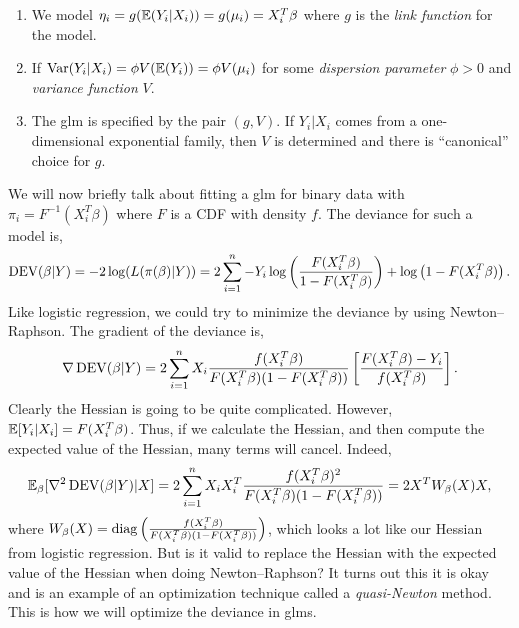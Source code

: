 \begin{enumerate}
    \item We  model $\eta_i = g({\mathbb{E}}(Y_i|X_i))=g(\mu_i)  =X_i^T\beta$ where $g$  is the \emph{link function} for the model.
    \item If  $\operatorname{Var}(Y_i|X_i)=\phi V({\mathbb{E}}(Y_i))=\phi V(\mu_i)$ for  some  \emph{dispersion parameter}  $\phi>0$ and \emph{variance function} $V$.
    \item The glm is specified by the pair  $(g,V)$. If   $Y_i|X_i$  comes  from  a  one-dimensional exponential family, then $V$  is  determined and there is ``canonical'' choice  for $g$.
\end{enumerate}

We will now briefly talk about fitting a glm for binary data with $\pi_i = F^{-1}(X_i^T\beta)$ where $F$ is a CDF with density  $f$. The deviance for such a  model is,
\[\operatorname{DEV}(\beta|Y)=-2\log(L(\pi(\beta)|Y)) = 2\sum_{i=1}^n-Y_i\log\left(\frac{F(X_i^T\beta)}{1-F(X_i^T\beta)}\right)+\log\left(1-F(X_i^T\beta)\right).  \]
Like logistic regression, we could try to minimize  the deviance by using Newton--Raphson. The gradient of the deviance is,
\[\nabla \operatorname{DEV}(\beta|Y) = 2\sum_{i=1}^n X_i  \frac{f(X_i^T\beta)}{F(X_i^T\beta)(1-F(X_i^T\beta))}\left[
    \frac{F(X_i^T\beta)-Y_i}{f(X_i^T\beta)}
\right]. \]
Clearly  the Hessian is going to  be quite  complicated. However, ${\mathbb{E}}[Y_i|X_i]  = F(X_i^T\beta)$.  Thus,  if we calculate the Hessian, and then  compute the expected value of the Hessian, many terms will cancel.  Indeed,
\[{\mathbb{E}}_{\beta}[\nabla^2\operatorname{DEV}(\beta|Y)|X] =  2\sum_{i=1}^n  X_iX_i^T\frac{f(X_i^T\beta)^2}{F(X_i^T\beta)(1-F(X_i^T\beta))} = 2X^TW_\beta(X)  X,  \]
where $W_\beta(X)  =  \operatorname{diag}\left(
    \frac{f(X_i^T\beta)}{F(X_i^T\beta)(1-F(X_i^T\beta))}
\right)$, which looks a lot like our Hessian from  logistic regression. But is it valid to replace the Hessian with the expected value of the Hessian when doing Newton--Raphson?  It turns  out this it is okay and is an example of an optimization technique called a \emph{quasi-Newton}  method.  This is how we will optimize the deviance in glms. 
